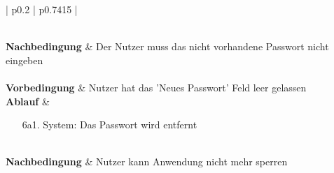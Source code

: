 \begin{tabularx}{\textwidth}{| p{} | p{} |}
\begin{enumerate}
		\end{enumerate}
	\\
	\hline
	\textbf{Nachbedingung} & Der Nutzer muss das nicht vorhandene Passwort nicht eingeben \\
	\hline
	 \\
	\hline
	\textbf{Vorbedingung} & Nutzer hat das 'Neues Passwort' Feld leer gelassen \\
	\hline
	\textbf{Ablauf} &
		\begin{enumerate}
			\item[6a1.] System: Das Passwort wird entfernt
		\end{enumerate}
	\\
	\hline
	\textbf{Nachbedingung} & Nutzer kann Anwendung nicht mehr sperren \\
	\hline
\end{tabularx}

